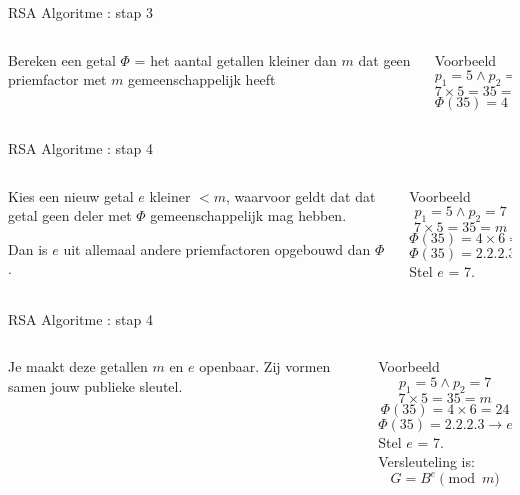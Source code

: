 \documentclass{beamer}
\begin{document}
\begin{frame}{RSA Algoritme : stap 3}
	\begin{columns}
		\begin{column}[T]{0.5\textwidth}
			Bereken een getal $\Phi$ =  het aantal getallen kleiner dan $m$ dat geen priemfactor met $m$ gemeenschappelijk heeft
		\end{column}
		\begin{column}[T]{0.5\textwidth}
			Voorbeeld
			\[ p_1 = 5 \wedge  p_2 = 7\]
			\[ 7 \times 5 = 35 = m \]
			\[ \Phi(35) =4 \times 6 = 24 \]
		\end{column}
	\end{columns}	
\end{frame}

\begin{frame}{RSA Algoritme : stap 4}
	\begin{columns}
		\begin{column}[T]{0.5\textwidth}
			Kies een nieuw getal $e$ kleiner $ < m$, waarvoor geldt dat dat getal geen deler met $\Phi$ gemeenschappelijk mag hebben.
			
			Dan is $e$  uit allemaal andere priemfactoren opgebouwd dan $\Phi$.
		\end{column}
		\begin{column}[T]{0.5\textwidth}
			Voorbeeld
			\[ p_1 = 5 \wedge  p_2 = 7\]
			\[ 7 \times 5 = 35 = m \]
			\[ \Phi(35) =4 \times 6 = 24 \]
			\[ \Phi(35) =  2 . 2 . 2 . 3  \rightarrow e \in {5,7,25} \]  
			Stel $e$ = 7.
		\end{column}
	\end{columns}	
\end{frame}


\begin{frame}{RSA Algoritme : stap 4}
	\begin{columns}
		\begin{column}[T]{0.5\textwidth}
			Je maakt deze getallen  $m$ en $e$ openbaar. Zij vormen samen jouw publieke sleutel.
		\end{column}
		\begin{column}[T]{0.5\textwidth}
			Voorbeeld
			\[ p_1 = 5 \wedge  p_2 = 7\]
			\[ 7 \times 5 = 35 = m \]
			\[ \Phi(35) =4 \times 6 = 24 \]
			\[ \Phi(35) =  2 . 2 . 2 . 3  \rightarrow e \in {5,7,25} \]  
			Stel $e$ = 7. \\
			Versleuteling is: \[ G = B^e  \pmod{m} \]
		\end{column}
	\end{columns}	
\end{frame}
\end{document}
